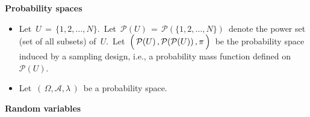 
\noindent
\textbf{Probability spaces}
\begin{itemize}
\item
    Let
    \,$U \,=\, \{1,2,\ldots,N\}$.\,
    Let
    \,$\mathcal{P}(U) \,=\, \mathcal{P}(\{1,2,\ldots,N\})$\,
    denote the power set (set of all subsets) of \,$U$.\,
    Let
    \,$\left(\,\mathcal{P}(U)\,,\mathcal{P}(\mathcal{P}(U))\,,\overset{{\color{white}-}}{\pi}\,\right)$\,
    be the probability space induced by a sampling design, i.e.,
    a probability mass function defined on
    \,$\mathcal{P}(U)$.\,
\item
    Let \,$\left(\,\Omega,\mathscr{A},\lambda\,\right)$\, be a probability space.
\end{itemize}

\vskip 0.2cm
\noindent
\textbf{Random variables}
